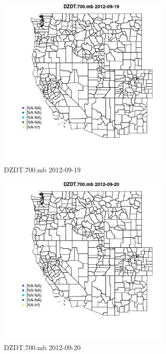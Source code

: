 \begin{figure} 
\centering  
\includegraphics[width=0.77\textwidth]{Code_Outputs/ML_input_report_ML_input_PM25_Step5_part_d_de_duplicated_aves_ML_input_MapObsDZDT700mb2012-09-19.jpg} 
\caption{\label{fig:ML_input_report_ML_input_PM25_Step5_part_d_de_duplicated_aves_ML_inputMapObsDZDT700mb2012-09-19}DZDT.700.mb 2012-09-19} 
\end{figure} 
 

\begin{figure} 
\centering  
\includegraphics[width=0.77\textwidth]{Code_Outputs/ML_input_report_ML_input_PM25_Step5_part_d_de_duplicated_aves_ML_input_MapObsDZDT700mb2012-09-20.jpg} 
\caption{\label{fig:ML_input_report_ML_input_PM25_Step5_part_d_de_duplicated_aves_ML_inputMapObsDZDT700mb2012-09-20}DZDT.700.mb 2012-09-20} 
\end{figure} 
 

